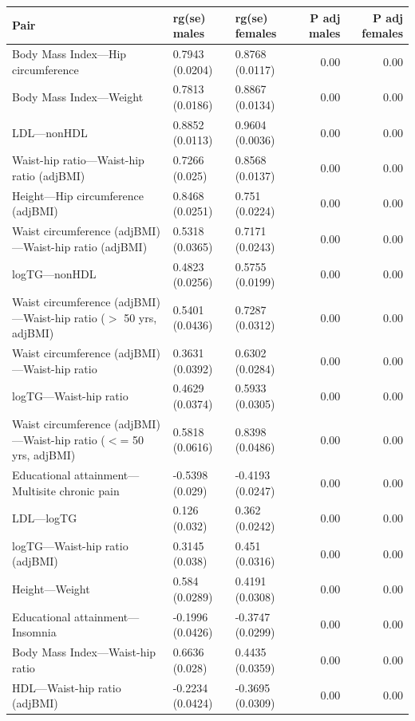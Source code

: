 \begin{table}[ht]
\centering
\begin{tabular}{lllrr}
  \hline
Pair & rg(se) males & rg(se) females & P adj males & P adj females \\ 
  \hline
Body Mass Index---Hip circumference & 0.7943 (0.0204) & 0.8768 (0.0117) & 0.00 & 0.00 \\ 
  Body Mass Index---Weight & 0.7813 (0.0186) & 0.8867 (0.0134) & 0.00 & 0.00 \\ 
  LDL---nonHDL & 0.8852 (0.0113) & 0.9604 (0.0036) & 0.00 & 0.00 \\ 
  Waist-hip ratio---Waist-hip ratio (adjBMI) & 0.7266 (0.025) & 0.8568 (0.0137) & 0.00 & 0.00 \\ 
  Height---Hip circumference (adjBMI) & 0.8468 (0.0251) & 0.751 (0.0224) & 0.00 & 0.00 \\ 
  Waist circumference (adjBMI)---Waist-hip ratio (adjBMI) & 0.5318 (0.0365) & 0.7171 (0.0243) & 0.00 & 0.00 \\ 
  logTG---nonHDL & 0.4823 (0.0256) & 0.5755 (0.0199) & 0.00 & 0.00 \\ 
  Waist circumference (adjBMI)---Waist-hip ratio ($>$ 50 yrs, adjBMI) & 0.5401 (0.0436) & 0.7287 (0.0312) & 0.00 & 0.00 \\ 
  Waist circumference (adjBMI)---Waist-hip ratio & 0.3631 (0.0392) & 0.6302 (0.0284) & 0.00 & 0.00 \\ 
  logTG---Waist-hip ratio & 0.4629 (0.0374) & 0.5933 (0.0305) & 0.00 & 0.00 \\ 
  Waist circumference (adjBMI)---Waist-hip ratio ($<$= 50 yrs, adjBMI) & 0.5818 (0.0616) & 0.8398 (0.0486) & 0.00 & 0.00 \\ 
  Educational attainment---Multisite chronic pain & -0.5398 (0.029) & -0.4193 (0.0247) & 0.00 & 0.00 \\ 
  LDL---logTG & 0.126 (0.032) & 0.362 (0.0242) & 0.00 & 0.00 \\ 
  logTG---Waist-hip ratio (adjBMI) & 0.3145 (0.038) & 0.451 (0.0316) & 0.00 & 0.00 \\ 
  Height---Weight & 0.584 (0.0289) & 0.4191 (0.0308) & 0.00 & 0.00 \\ 
  Educational attainment---Insomnia & -0.1996 (0.0426) & -0.3747 (0.0299) & 0.00 & 0.00 \\ 
  Body Mass Index---Waist-hip ratio & 0.6636 (0.028) & 0.4435 (0.0359) & 0.00 & 0.00 \\ 
  HDL---Waist-hip ratio (adjBMI) & -0.2234 (0.0424) & -0.3695 (0.0309) & 0.00 & 0.00 \\ 

\end{tabular}
\end{table}
